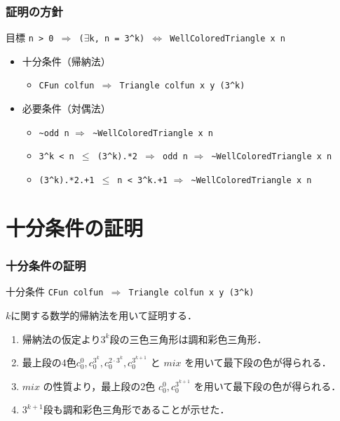 \documentclass[dvipdfmx,cjk]{beamer}
\begin{document}
\begin{frame}[fragile]
  \frametitle{証明の方針}
  \begin{block}{目標}
    {\tt{n > 0 $\Rightarrow$ ($\exists$k, n = 3\verb|^|k) $\Leftrightarrow$ WellColoredTriangle x n}}
  \end{block}
  \vfill
  \begin{itemize}
  \item
    十分条件（帰納法）
    \begin{itemize}
    \item
      {\tt{CFun colfun $\Rightarrow$ Triangle colfun x y (3\verb|^|k)}}
    \end{itemize}
    \vfill
  \item
    必要条件（対偶法）
    \begin{itemize}
    \item
      \color{red}
      {\tt{\verb|~|odd n}}
      \color{black}
      {\tt{$\Rightarrow$ \verb|~|WellColoredTriangle x n}}
    \item
      \color{red}
      {\tt{3\verb|^|k < n $\leq$ (3\verb|^|k).*2 $\Rightarrow$ odd n}}
      \color{black}
      {\tt{$\Rightarrow$ \verb|~|WellColoredTriangle x n}} 
    \item
      \color{red}
      {\tt{(3\verb|^|k).*2.+1 $\leq$ n < 3\verb|^|k.+1}}
      \color{black}      
      {\tt{$\Rightarrow$ \verb|~|WellColoredTriangle x n}}
    \end{itemize}
  \end{itemize}
\end{frame}


\section{十分条件の証明}
\begin{frame}[fragile]
  \frametitle{十分条件の証明}
  \begin{block}{十分条件}
    {\tt{CFun colfun $\Rightarrow$ Triangle colfun x y (3\verb|^|k)}}
  \end{block}
  {\small
    \vfill
    \begin{center}
    
    \end{center}
    $k$に関する数学的帰納法を用いて証明する．
    \begin{enumerate}
    \item
      帰納法の仮定より$3^k$段の三色三角形は調和彩色三角形．
    \item
      最上段の$4$色$c^0_0, c^{3^{k}}_0, c^{2\cdot3^{k}}_0, c^{3^{k+1}}_0$ と $mix$ を用いて最下段の色が得られる．
    \item
      $mix$ の性質より，最上段の$2$色 $c^0_0, c^{3^{k+1}}_0$ を用いて最下段の色が得られる．
    \item
      $3^{k+1}$段も調和彩色三角形であることが示せた．
    \end{enumerate}
  } 
\end{frame}
\end{document}
